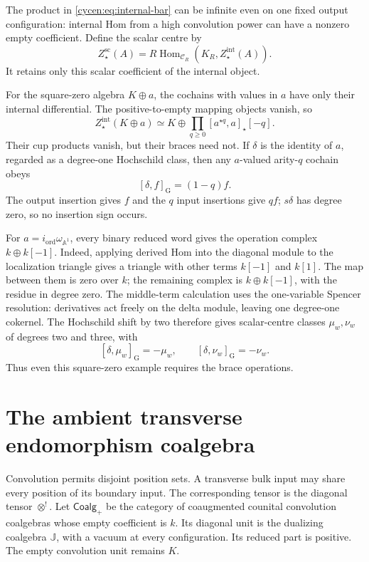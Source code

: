 The product in \eqref{cycen:eq:internal-bar} can be infinite
even on one fixed output configuration: internal Hom from
a high convolution power can have a nonzero empty coefficient.
Define the scalar centre by
\[
 Z_\star^{\mathrm{sc}}(A)
  =R\operatorname{Hom}_{\mathscr C_R}
              (K_R,Z_\star^{\mathrm{int}}(A)).
\]
It retains only this scalar coefficient of the internal object.

For the square-zero algebra $K\oplus a$, the cochains with
values in $a$ have only their internal differential. The
positive-to-empty mapping objects vanish, so
\[
 Z_\star^{\mathrm{int}}(K\oplus a)
   \simeq K\oplus\prod_{q\geq0}[a^{\star q},a]_\star[-q].
\]
Their cup products vanish, but their braces need not. If
$\delta$ is the identity of $a$, regarded as a degree-one
Hochschild class, then any $a$-valued arity-$q$ cochain obeys
\begin{equation}\label{cycen:eq:arity-bracket}
                 [\delta,f]_{\mathrm G}=(1-q)f.
\end{equation}
The output insertion gives $f$ and the $q$ input insertions
give $qf$; $s\delta$ has degree zero, so no insertion sign occurs.

For $a=i_{\mathrm{ord}}\omega_{\mathbb A^1}$, every binary
reduced word gives the operation complex $k\oplus k[-1]$.
Indeed, applying derived Hom into the diagonal module to the
localization triangle gives a triangle with other terms
$k[-1]$ and $k[1]$. The map between them is zero over $k$;
the remaining complex is $k\oplus k[-1]$, with the residue
in degree zero. The middle-term calculation uses the one-variable
Spencer resolution: derivatives act freely on the delta module,
leaving one degree-one cokernel. The Hochschild shift by two
therefore gives scalar-centre classes $\mu_w,\nu_w$ of degrees
two and three, with
\[
 [\delta,\mu_w]_{\mathrm G}=-\mu_w,
 \qquad [\delta,\nu_w]_{\mathrm G}=-\nu_w.
\]
Thus even this square-zero example requires the brace operations.

\section{The ambient transverse endomorphism coalgebra}
\label{cycen:sec:transverse}

Convolution permits disjoint position sets. A transverse
bulk input may share every position of its boundary input.
The corresponding tensor is the diagonal tensor $\otimes^!$.
Let $\mathsf{Coalg}_+$ be the category of coaugmented counital
convolution coalgebras whose empty coefficient is $k$.
Its diagonal unit is the dualizing coalgebra $\mathbb J$,
with a vacuum at every configuration. Its reduced part is
positive. The empty convolution unit remains $K$.

